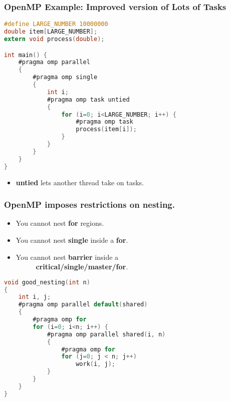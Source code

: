 \begin{frame}[fragile]
  \frametitle{OpenMP Example: Improved version of Lots of Tasks}

  \begin{changemargin}{2cm}
  \begin{lstlisting}[language=C,morekeywords={foreach,pragma,omp,parallel,single,nowait,task,untied,barrier,taskyield,mergeable,final,taskwait,critical}]
#define LARGE_NUMBER 10000000
double item[LARGE_NUMBER];
extern void process(double);

int main() {
    #pragma omp parallel
    {
        #pragma omp single
        {
            int i;
            #pragma omp task untied
            {
                for (i=0; i<LARGE_NUMBER; i++) {
                    #pragma omp task
                    process(item[i]);
                }
            }
        }
    }
}
  \end{lstlisting}
  \large
  \begin{itemize}
    \item {\bf untied} lets another thread take on tasks.
  \end{itemize}
  \end{changemargin}
\end{frame}

\begin{frame}[fragile]
  \frametitle{OpenMP imposes restrictions on nesting.}

  \begin{changemargin}{2cm}
\large
  \begin{itemize}
    \item You cannot nest {\bf for} regions.
    \item You cannot nest {\bf single} inside a {\bf for}.
    \item You cannot nest {\bf barrier} inside a\\~~~~~ {\bf critical/single/master/for}.
  \end{itemize}

  \begin{lstlisting}[language=C,morekeywords={foreach,pragma,omp,parallel,single,nowait,task,untied,barrier,taskyield,mergeable,final,taskwait,critical}]
void good_nesting(int n)
{
    int i, j;
    #pragma omp parallel default(shared)
    {
        #pragma omp for
        for (i=0; i<n; i++) {
            #pragma omp parallel shared(i, n)
            {
                #pragma omp for
                for (j=0; j < n; j++)
                    work(i, j);
            }
        }
    }
}
  \end{lstlisting}
  \end{changemargin}
  
\end{frame}

